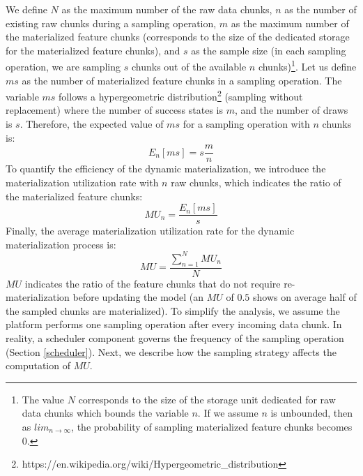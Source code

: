 We define $N$ as the maximum number of the raw data chunks, $n$ as the number of existing raw chunks during a sampling operation, $m$ as the maximum number of the materialized feature chunks (corresponds to the size of the dedicated storage for the materialized feature chunks), and $s$ as the sample size (in each sampling operation, we are sampling $s$ chunks out of the available $n$ chunks)\footnote{The value $N$ corresponds to the size of the storage unit dedicated for raw data chunks which bounds the variable $n$. If we assume $n$ is unbounded, then as $lim_{n\to\infty}$, the probability of sampling materialized feature chunks becomes $0$.}.
Let us define $ms$ as the number of materialized feature chunks in a sampling operation.
The variable $ms$ follows a hypergeometric distribution\footnote{https://en.wikipedia.org/wiki/Hypergeometric\_distribution} (sampling without replacement) where the number of success states is $m$, and the number of draws is $s$.
Therefore, the expected value of $ms$ for a sampling operation with $n$ chunks is:
\begin{equation*}
E_n[ms] = s\dfrac{m}{n}
\end{equation*}
To quantify the efficiency of the dynamic materialization, we introduce the materialization utilization rate with $n$ raw chunks, which indicates the ratio of the materialized feature chunks:
\begin{equation*}   
 MU_n=  \dfrac{E_n[ms]}{s}
\end{equation*}
Finally, the average materialization utilization rate for the dynamic materialization process is:
\begin{equation}  \label{formula-mu}
MU = \dfrac{\sum_{n=1}^N MU_n}{N}
\end{equation}
$MU$ indicates the ratio of the feature chunks that do not require re-materialization before updating the model (an $MU$ of $0.5$ shows on average half of the sampled chunks are materialized).
To simplify the analysis, we assume the platform performs one sampling operation after every incoming data chunk. 
In reality, a scheduler component governs the frequency of the sampling operation (Section \ref{scheduler}).
Next, we describe how the sampling strategy affects the computation of $MU$.

